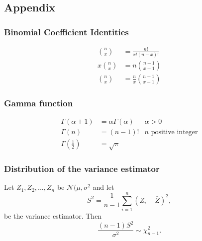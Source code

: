 \documentclass{article}
\theoremstyle{plain}
\theoremstyle{definition}
\theoremstyle{plain}
\theoremstyle{plain}
\begin{document}
\begin{multicols}{2}
\newpage

\newpage
\appendix

\section{Appendix}

\subsubsection*{Binomial Coefficient Identities}

\begin{align}
  \binom{n}{x} &= \frac{n!}{x!(n-x)!}
  \\
  x \binom{n}{x} &= n \binom{n - 1}{x - 1}
  \\
  \binom{n}{x} &= \frac{n}{x} \binom{n - 1}{x - 1}
\end{align}

\subsubsection*{Gamma function}

\begin{align}
  \Gamma(\alpha + 1) &= \alpha \Gamma(\alpha) &\alpha > 0
  \\
  \Gamma(n) &= (n - 1)! & n \text{ positive integer}
  \\
  \Gamma \left( \frac{1}{2} \right) &= \sqrt{\pi}
\end{align}

\subsubsection*{Distribution of the variance estimator}
Let $Z_1, Z_2, ..., Z_n$ be $\mathcal{N}(\mu, \sigma^{2}$
and let
\[
  S^2 = \frac{1}{n-1} \sum_{i = 1}^{n} (Z_i - \bar{Z})^{2},
\]
be the variance estimator.
Then
\[
  \frac{(n-1)S^2}{\sigma^{2}} \sim \chi^2_{n-1}.
\]

\end{multicols}
\end{document}
